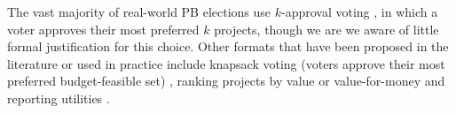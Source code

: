 \documentclass[runningheads]{llncs}
\begin{document}



The vast majority of real-world PB elections use $k$-approval voting \cite{aziz2021participatory}, in which a voter approves their most preferred $k$ projects, though we are we aware of little formal justification for this choice.  Other formats that have been proposed in the literature or used in practice include knapsack voting (voters approve their most preferred budget-feasible set)  \cite{goel2019knapsack}, ranking projects by value or value-for-money  \cite{aziz2020expanding, benade2021preference} and reporting utilities \cite{peters2021proportional}. 
\end{document}
